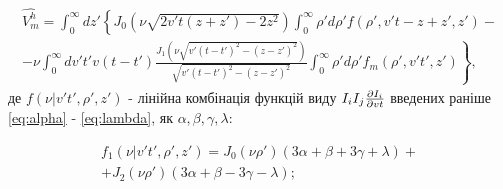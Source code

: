 

\begin{equation} \begin{aligned} \label{eq:vmh_final}
\hat{V_m^h} = \int_{0}^{\infty} dz'
\left\{ J_0 \left( \nu \sqrt{2 v't (z + z') - 2 z^2} \right) 
\int_{0}^{\infty} \rho' d \rho'
f (\rho',v't - z + z',z') - \right. \\ 
\left. - \nu \int_{0}^{\infty} dv't' v (t-t') 
\frac{J_1 \left( \nu \sqrt{v'(t-t')^2 - (z-z')^2} \right)}
{\sqrt{v'(t-t')^2 - (z-z')^2}} 
\int_{0}^{\infty} \rho' d\rho'
f_m (\rho',v't',z')  \right\},
\end{aligned} \end{equation}
%
де $ f ( \nu | v't', \rho', z') $ - лінійна комбінація функцій виду
$ I_i I_j \frac{\partial I_i}{\partial vt} $ введених раніше \eqref{eq:alpha} - 
\eqref{eq:lambda}, як $ \alpha, \beta, \gamma, \lambda $:

\begin{equation} \begin{aligned}
f_1 ( \nu | v't', \rho', z') = 
J_0 (\nu \rho') (3 \alpha + \beta + 3 \gamma + \lambda) + \\
+ J_2 (\nu \rho') (3 \alpha + \beta - 3 \gamma - \lambda);
\end{aligned} \end{equation}

